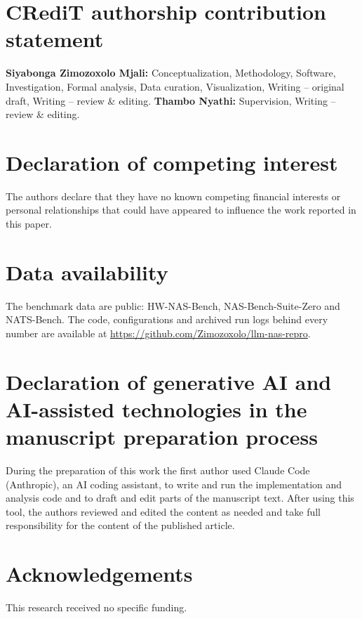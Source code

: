 \documentclass[preprint,12pt,authoryear]{elsarticle}
\begin{document}
\section*{CRediT authorship contribution statement}
\textbf{Siyabonga Zimozoxolo Mjali:} Conceptualization, Methodology, Software, Investigation, Formal analysis, Data curation, Visualization, Writing -- original draft, Writing -- review \& editing. \textbf{Thambo Nyathi:} Supervision, Writing -- review \& editing.

\section*{Declaration of competing interest}
The authors declare that they have no known competing financial interests or personal relationships that could have appeared to influence the work reported in this paper.

\section*{Data availability}
The benchmark data are public: HW-NAS-Bench, NAS-Bench-Suite-Zero and NATS-Bench. The code, configurations and archived run logs behind every number are available at \url{https://github.com/Zimozoxolo/llm-nas-repro}.

\section*{Declaration of generative AI and AI-assisted technologies in the manuscript preparation process}
During the preparation of this work the first author used Claude Code (Anthropic), an AI coding assistant, to write and run the implementation and analysis code and to draft and edit parts of the manuscript text. After using this tool, the authors reviewed and edited the content as needed and take full responsibility for the content of the published article.

\section*{Acknowledgements}
This research received no specific funding.

\appendix
\end{document}
